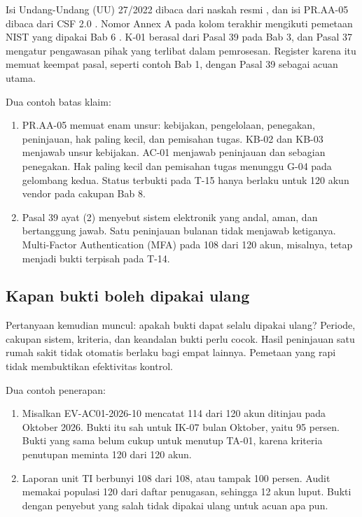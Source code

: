 Isi Undang-Undang (UU) 27/2022 dibaca dari naskah resmi \cite{uu27-2022-pdp}, dan isi PR.AA-05
dibaca dari CSF 2.0 \cite{nistcsf2}. Nomor Annex A pada kolom terakhir mengikuti pemetaan NIST
yang dipakai Bab 6 \cite{c06-nist-irefs}. K-01 berasal dari Pasal 39 pada Bab 3, dan Pasal 37
mengatur pengawasan pihak yang terlibat dalam pemrosesan. Register karena itu memuat keempat
pasal, seperti contoh Bab 1, dengan Pasal 39 sebagai acuan utama.

Dua contoh batas klaim:
\begin{enumerate}
  \item PR.AA-05 memuat enam unsur: kebijakan, pengelolaan, penegakan, peninjauan, hak paling
  kecil, dan pemisahan tugas. KB-02 dan KB-03 menjawab unsur kebijakan. AC-01 menjawab peninjauan
  dan sebagian penegakan. Hak paling kecil dan pemisahan tugas menunggu G-04 pada gelombang
  kedua. Status terbukti pada T-15 hanya berlaku untuk 120 akun vendor pada cakupan Bab 8.
  \item Pasal 39 ayat (2) menyebut sistem elektronik yang andal, aman, dan bertanggung jawab. Satu
  peninjauan bulanan tidak menjawab ketiganya. Multi-Factor Authentication (MFA) pada 108 dari
  120 akun, misalnya, tetap menjadi bukti terpisah pada T-14.
\end{enumerate}

\subsection*{Kapan bukti boleh dipakai ulang}

Pertanyaan kemudian muncul: apakah bukti dapat selalu dipakai ulang? Periode, cakupan sistem,
kriteria, dan keandalan bukti perlu cocok. Hasil peninjauan satu rumah sakit tidak otomatis
berlaku bagi empat lainnya. Pemetaan yang rapi tidak membuktikan efektivitas kontrol.

Dua contoh penerapan:
\begin{enumerate}
  \item Misalkan EV-AC01-2026-10 mencatat 114 dari 120 akun ditinjau pada Oktober 2026. Bukti itu
  sah untuk IK-07 bulan Oktober, yaitu 95 persen. Bukti yang sama belum cukup untuk menutup TA-01,
  karena kriteria penutupan meminta 120 dari 120 akun.
  \item Laporan unit TI berbunyi 108 dari 108, atau tampak 100 persen. Audit memakai populasi 120
  dari daftar penugasan, sehingga 12 akun luput. Bukti dengan penyebut yang salah tidak dipakai
  ulang untuk acuan apa pun.
\end{enumerate}

